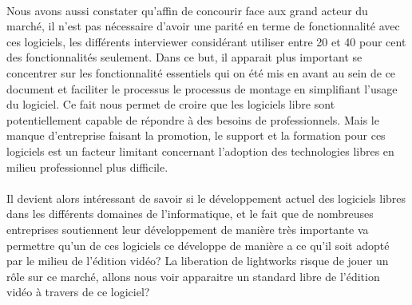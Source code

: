 \paragraph{}

Nous avons aussi constater qu'affin de concourir face aux grand acteur
du marché, il n'est pas nécessaire d'avoir une parité en terme
de fonctionnalité avec ces logiciels, les différents interviewer
considérant utiliser entre 20 et 40 pour cent des fonctionnalités
seulement. Dans ce but, il apparait plus important se concentrer
sur les fonctionnalité essentiels qui on été mis en avant au sein
de ce document et faciliter le processus le processus de montage en
simplifiant l'usage du logiciel. Ce fait nous permet de croire que les
logiciels libre sont potentiellement capable de répondre à des besoins
de professionnels.  Mais le manque d'entreprise faisant la promotion,
le support et la formation pour ces logiciels est un facteur limitant
concernant l'adoption des technologies libres en milieu professionnel
plus difficile.

\paragraph{}

Il devient alors intéressant de savoir si le développement actuel des
logiciels libres dans les différents domaines de l'informatique, et
le fait que de nombreuses entreprises soutiennent leur développement
de manière très importante va permettre qu'un de ces logiciels ce
développe de manière a ce qu'il soit adopté par le milieu de l'édition
vidéo? La liberation de lightworks risque de jouer un rôle sur ce
marché, allons nous voir apparaitre un standard libre de l'édition
vidéo à travers de ce logiciel?
